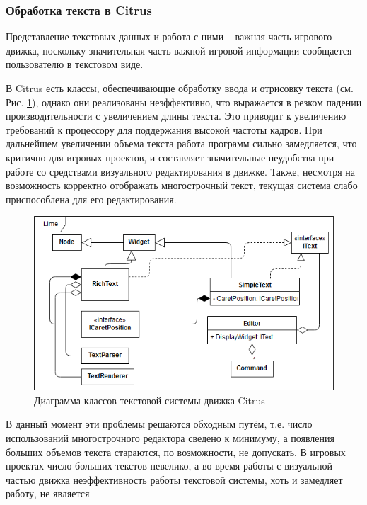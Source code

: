 \documentclass{fefu}
\begin{document}
			\subsubsection{Обработка текста в Citrus}
				\par Представление текстовых данных и работа с ними -- важная часть игрового
				движка, поскольку значительная часть важной игровой информации сообщается 
				пользователю в текстовом виде. 
				\par В Citrus есть классы, обеспечивающие обработку ввода и отрисовку текста 
				(см. Рис. \ref{diag:CitrusTextSystem}), 
				однако они реализованы неэффективно, что выражается в резком падении 
				производительности с увеличением длины текста. Это приводит к увеличению
				требований к процессору для поддержания высокой частоты кадров. При дальнейшем
				увеличении объема текста работа программ сильно замедляется, что критично для
				игровых проектов, и составляет значительные неудобства при работе со средствами
				визуального редактирования в движке. Также, несмотря на
				возможность корректно отображать многострочный текст, текущая система слабо
				приспособлена для его редактирования.
				\begin{figure}[h]
					\centering
					\includegraphics[width=1\linewidth]{diagrams/CitrusTextSystem.png}
					\caption{Диаграмма классов текстовой системы движка Citrus}
					\label{diag:CitrusTextSystem}
				\end{figure}
				\par В данный момент эти проблемы решаются обходным путём, т.е. число
				использований многострочного редактора сведено к минимуму, а появления больших
				объемов текста стараются, по возможности, не допускать. В игровых проектах
				число больших текстов невелико, а во время работы с визуальной частью движка
				неэффективность работы текстовой системы, хоть и замедляет работу, не является
\end{document}
